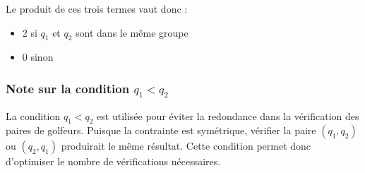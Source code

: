 \documentclass{article}
\begin{document}
Le produit de ces trois termes vaut donc :
\begin{itemize}
   \item 2 si $q_1$ et $q_2$ sont dans le même groupe
   \item 0 sinon
\end{itemize}

\subsubsection*{Note sur la condition $q_1 < q_2$}
La condition $q_1 < q_2$ est utilisée pour éviter la redondance dans la vérification des paires de golfeurs. Puisque la contrainte est symétrique, vérifier la paire $(q_1,q_2)$ ou $(q_2,q_1)$ produirait le même résultat. Cette condition permet donc d'optimiser le nombre de vérifications nécessaires.
\end{document}
